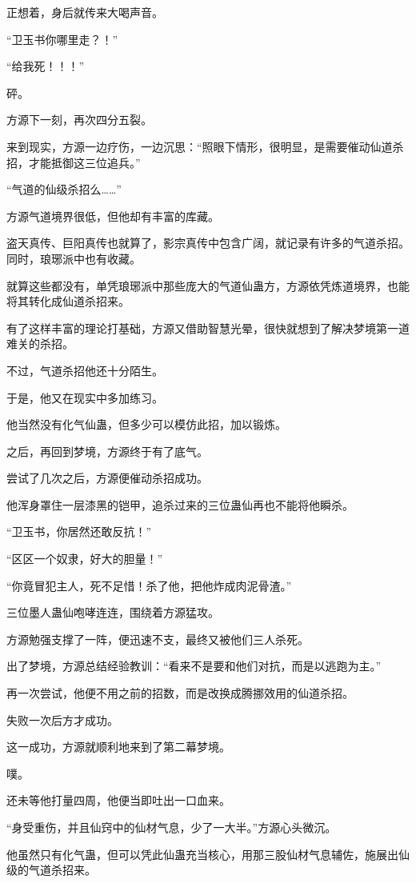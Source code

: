 \begin{this_body}
正想着，身后就传来大喝声音。

“卫玉书你哪里走？！”

“给我死！！！”

砰。

方源下一刻，再次四分五裂。

来到现实，方源一边疗伤，一边沉思：“照眼下情形，很明显，是需要催动仙道杀招，才能抵御这三位追兵。”

“气道的仙级杀招么……”

方源气道境界很低，但他却有丰富的库藏。

盗天真传、巨阳真传也就算了，影宗真传中包含广阔，就记录有许多的气道杀招。同时，琅琊派中也有收藏。

就算这些都没有，单凭琅琊派中那些庞大的气道仙蛊方，方源依凭炼道境界，也能将其转化成仙道杀招来。

有了这样丰富的理论打基础，方源又借助智慧光晕，很快就想到了解决梦境第一道难关的杀招。

不过，气道杀招他还十分陌生。

于是，他又在现实中多加练习。

他当然没有化气仙蛊，但多少可以模仿此招，加以锻炼。

之后，再回到梦境，方源终于有了底气。

尝试了几次之后，方源便催动杀招成功。

他浑身罩住一层漆黑的铠甲，追杀过来的三位蛊仙再也不能将他瞬杀。

“卫玉书，你居然还敢反抗！”

“区区一个奴隶，好大的胆量！”

“你竟冒犯主人，死不足惜！杀了他，把他炸成肉泥骨渣。”

三位墨人蛊仙咆哮连连，围绕着方源猛攻。

方源勉强支撑了一阵，便迅速不支，最终又被他们三人杀死。

出了梦境，方源总结经验教训：“看来不是要和他们对抗，而是以逃跑为主。”

再一次尝试，他便不用之前的招数，而是改换成腾挪效用的仙道杀招。

失败一次后方才成功。

这一成功，方源就顺利地来到了第二幕梦境。

噗。

还未等他打量四周，他便当即吐出一口血来。

“身受重伤，并且仙窍中的仙材气息，少了一大半。”方源心头微沉。

他虽然只有化气蛊，但可以凭此仙蛊充当核心，用那三股仙材气息辅佐，施展出仙级的气道杀招来。


\end{this_body}
